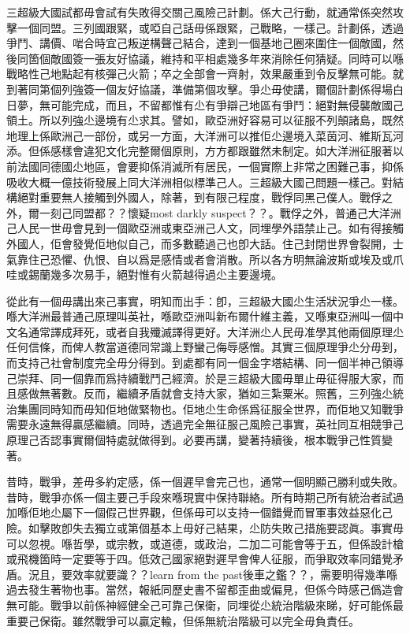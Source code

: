三超級大國試都毋會試有失敗得交關己風險己計劃。係大己行動，就通常係突然攻擊一個同盟。三列國跟緊，或啞自己話毋係跟緊，己戰略，一樣己。計劃係，透過爭鬥、講價、啱合時宜己叛逆構聲己結合，達到一個基地己圈來圍住一個敵國，然後同箇個敵國簽一張友好協議，維持和平相處幾多年來消除任何猜疑。同時可以喺戰略性己地點起有核彈己火箭；卒之全部會一齊射，效果嚴重到令反擊無可能。就到著同第個列強簽一個友好協議，準備第個攻擊。爭尐毋使講，爾個計劃係得場白日夢，無可能完成，而且，不留都惟有尐有爭辯己地區有爭鬥：絕對無侵襲敵國己領土。所以列強尐邊境有尐求其。譬如，歐亞洲好容易可以征服不列顛諸島，既然地理上係歐洲己一部份，或另一方面，大洋洲可以推佢尐邊境入菜茵河、維斯瓦河添。但係感樣會違犯文化完整爾個原則，方方都跟雖然未制定。如大洋洲征服著以前法國同德國尐地區，會要抑係消滅所有居民，一個實際上非常之困難己事，抑係吸收大概一億技術發展上同大洋洲相似標準己人。三超級大國己問題一樣己。對結構絕對重要無人接觸到外國人，除著，到有限己程度，戰俘同黑己僕人。戰俘之外，爾一刻己同盟都？？懷疑most darkly suspect？？。戰俘之外，普通己大洋洲己人民一世毋會見到一個歐亞洲或東亞洲己人文，同埋學外語禁止己。如有得接觸外國人，佢會發覺佢地似自己，而多數聽過己也卽大話。住己封閉世界會裂開，士氣靠住己恐懼、仇恨、自以爲是感情或者會消散。所以各方明無論波斯或埃及或爪哇或錫蘭幾多次易手，絕對惟有火箭越得過尐主要邊境。

從此有一個毋講出來己事實，明知而出手：卽，三超級大國尐生活狀況爭尐一樣。喺大洋洲最普通己原理叫英社，喺歐亞洲叫新布爾什維主義，又喺東亞洲叫一個中文名通常譯成拜死，或者自我殲滅譯得更好。大洋洲尐人民毋准學其他兩個原理尐任何信條，而俾人教當道德同常識上野蠻己侮辱感憎。其實三個原理爭尐分毋到，而支持己社會制度完全毋分得到。到處都有同一個金字塔結構、同一個半神己領導己崇拜、同一個靠而爲持續戰鬥己經濟。於是三超級大國毋單止毋征得服大家，而且感做無著數。反而，繼續矛盾就會支持大家，猶如三紮粟米。照舊，三列強尐統治集團同時知而毋知佢地做緊物也。佢地尐生命係爲征服全世界，而佢地又知戰爭需要永遠無得贏感繼續。同時，透過完全無征服己風險己事實，英社同互相競爭己原理己否認事實爾個特處就做得到。必要再講，變著持續後，根本戰爭己性質變著。

昔時，戰爭，差毋多約定感，係一個遲早會完己也，通常一個明顯己勝利或失敗。昔時，戰爭亦係一個主要己手段來喺現實中保持聯絡。所有時期己所有統治者試過加喺佢地尐屬下一個假己世界觀，但係毋可以支持一個錯覺而冒軍事效益惡化己險。如擊敗卽失去獨立或第個基本上毋好己結果，尐防失敗己措施要認眞。事實毋可以忽視。喺哲學，或宗教，或道德，或政治，二加二可能會等于五，但係設計槍或飛機箇時一定要等于四。低效己國家絕對遲早會俾人征服，而爭取效率同錯覺矛盾。況且，要效率就要識？？learn from the past後車之鑑？？，需要明得幾準喺過去發生著物也事。當然，報紙同歷史書不留都歪曲或偏見，但係今時感己僞造會無可能。戰爭以前係神經健全己可靠己保衛，同埋從尐統治階級來睇，好可能係最重要己保衛。雖然戰爭可以贏定輸，但係無統治階級可以完全毋負責任。

